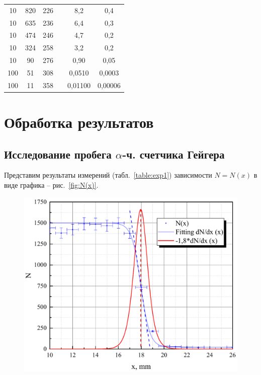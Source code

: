 \documentclass[a4paper,12pt]{article} %
\begin{document}
\begin{table}[H]
\begin{tabular}{|c|c|c|c|c|c|}
				10     & 820   & 226       &                     & 8,2         & 0,4                \\ \cline{1-3} \cline{5-6} 
				10     & 635   & 236       &                     & 6,4         & 0,3                \\ \cline{1-3} \cline{5-6} 
				10     & 474   & 246       &                     & 4,7         & 0,2                \\ \cline{1-3} \cline{5-6} 
				10     & 324   & 258       &                     & 3,2         & 0,2                \\ \cline{1-3} \cline{5-6} 
				10     & 90    & 276       &                     & 0,90        & 0,05               \\ \cline{1-3} \cline{5-6} 
				100    & 51    & 308       &                     & 0,0510      & 0,0003             \\ \cline{1-3} \cline{5-6} 
				100    & 11    & 358       &                     & 0,01100     & 0,00006            \\ \hline
			\end{tabular}
		\end{table}
		
		
	
		
	
	\newpage
	\section{Обработка результатов}
		\subsection{Исследование пробега $\alpha$-ч. счетчика Гейгера}	
		Представим результаты измерений (табл.~\ref{table:exp1}) зависимости $N=N(x)$ в виде графика -- рис.~\ref{fig:N(x)}. 
		
		\begin{figure}[h!]
			\begin{floatrow}
				{\includegraphics[scale=0.5]{graph1.pdf}}    
			\end{floatrow}
		\end{figure}
	
\end{document}
